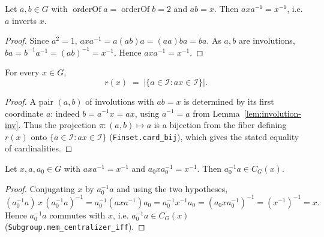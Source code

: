 \begin{lemma}
    \label{lem:inverts}
    \leanok
    Let $a, b \in G$ with $\operatorname{orderOf} a = \operatorname{orderOf} b = 2$
    and $ab = x$. Then $a x a^{-1} = x^{-1}$, i.e. $a$ inverts $x$.
\end{lemma}
\begin{proof}
    Since $a^2 = 1$, $a x a^{-1} = a (ab) a = (a a) b a = b a$. As $a, b$ are
    involutions, $ba = b^{-1} a^{-1} = (ab)^{-1} = x^{-1}$. Hence
    $a x a^{-1} = x^{-1}$.
\end{proof}

\begin{lemma}
    \label{lem:r-eq-invert-card}
    \leanok
    For every $x \in G$,
    \[
        r(x) \;=\; \bigl|\{a \in \mathcal{I} : a x \in \mathcal{I}\}\bigr| .
    \]
\end{lemma}
\begin{proof}
    A pair $(a,b)$ of involutions with $ab = x$ is determined by its first
    coordinate $a$: indeed $b = a^{-1} x = a x$, using $a^{-1} = a$ from
    Lemma~\ref{lem:involution-inv}. Thus the projection $\pi : (a,b) \mapsto a$ is
    a bijection from the fiber defining $r(x)$ onto
    $\{a \in \mathcal{I} : a x \in \mathcal{I}\}$
    (\texttt{Finset.card\_bij}), which gives the stated equality of
    cardinalities.
\end{proof}

\begin{lemma}
    \label{lem:inv-mul-mem-centralizer}
    \leanok
    Let $x, a, a_0 \in G$ with $a x a^{-1} = x^{-1}$ and
    $a_0 x a_0^{-1} = x^{-1}$. Then $a_0^{-1} a \in C_G(x)$.
\end{lemma}
\begin{proof}
    Conjugating $x$ by $a_0^{-1} a$ and using the two hypotheses,
    \[
        (a_0^{-1} a)\, x\, (a_0^{-1} a)^{-1}
        = a_0^{-1} (a x a^{-1}) a_0
        = a_0^{-1} x^{-1} a_0
        = (a_0 x a_0^{-1})^{-1}
        = (x^{-1})^{-1} = x .
    \]
    Hence $a_0^{-1} a$ commutes with $x$, i.e.
    $a_0^{-1} a \in C_G(x)$ (\texttt{Subgroup.mem\_centralizer\_iff}).
\end{proof}


